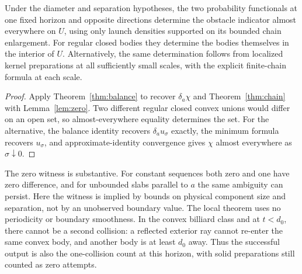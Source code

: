 \begin{corollary}\label{cor:local}
Under the diameter and separation hypotheses, the two probability
functionals at one fixed horizon and opposite directions determine the
obstacle indicator almost everywhere on $U$, using only launch densities
supported on its bounded chain enlargement. For regular closed bodies
they determine the bodies themselves in the interior of $U$.
Alternatively, the same determination follows from localized kernel
preparations at all sufficiently small scales, with the explicit
finite-chain formula at each scale.
\end{corollary}
\begin{proof}
Apply Theorem~\ref{thm:balance} to recover $\delta_a\chi$ and
Theorem~\ref{thm:chain} with Lemma~\ref{lem:zero}. Two different regular
closed convex unions would differ on an open set, so almost-everywhere
equality determines the set. For the alternative, the balance identity
recovers $\delta_a u_\sigma$ exactly, the minimum formula recovers
$u_\sigma$, and approximate-identity convergence gives $\chi$ almost
everywhere as $\sigma\downarrow0$.
\end{proof}

The zero witness is substantive. For constant sequences both zero and
one have zero difference, and for unbounded slabs parallel to $a$ the
same ambiguity can persist. Here the witness is implied by bounds on
physical component size and separation, not by an unobserved boundary
value. The local theorem uses no periodicity or boundary smoothness.
In the convex billiard class and at $t<d_0$, there cannot be a second
collision: a reflected exterior ray cannot re-enter the same convex
body, and another body is at least $d_0$ away. Thus the successful
output is also the one-collision count at this horizon, with solid
preparations still counted as zero attempts.
